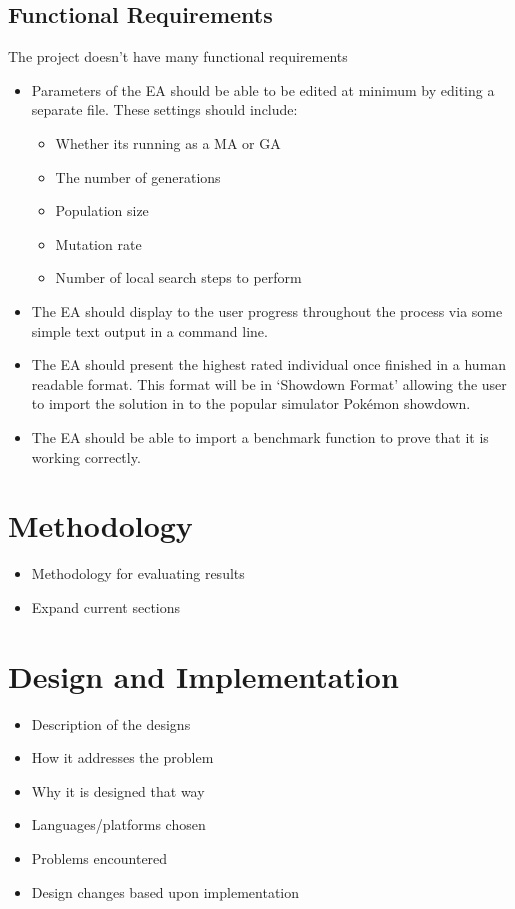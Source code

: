 \documentclass[a4paper]{article}
\newcommand{\Pokemon}{Pok\'{e}mon}
\begin{document}
\subsection{Functional Requirements}
The project doesn't have many functional requirements
\begin{itemize}
	\item Parameters of the EA should be able to be edited at minimum by editing a separate file. These settings should include:
	\begin{itemize}
		\item Whether its running as a MA or GA
		\item The number of generations
		\item Population size
		\item Mutation rate
		\item Number of local search steps to perform
	\end{itemize}
	\item The EA should display to the user progress throughout the process via some simple text output in a command line.
	\item The EA should present the highest rated individual once finished in a human readable format. This format will be in `Showdown Format' allowing the user to import the solution in to the popular simulator \Pokemon{} showdown.
	\item The EA should be able to import a benchmark function to prove that it is working correctly.
\end{itemize}

\section{Methodology}
\begin{itemize}
    \item Methodology for evaluating results
	\item Expand current sections
\end{itemize}

\section{Design and Implementation}
\begin{itemize}
   \item Description of the designs
   \item How it addresses the problem
   \item Why it is designed that way
   \item Languages/platforms chosen
   \item Problems encountered
   \item Design changes based upon implementation
\end{itemize}
\end{document}
